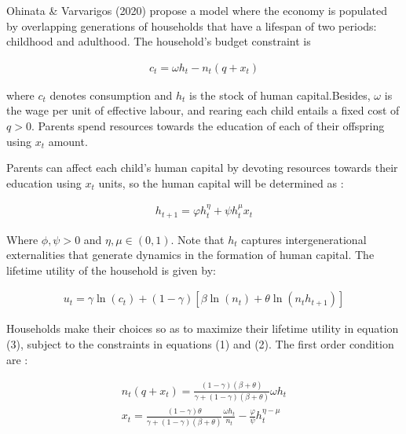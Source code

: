 \begin{enumerate}[label=(\alph*)]

Ohinata \& Varvarigos (2020) propose a model where the economy is populated by overlapping generations of households that have
a lifespan of two periods: childhood and adulthood. The household’s budget constraint is

    \begin{equation}
    \begin{aligned}
    c_{t} = \omega h_{t} - n_{t}(q+x_{t})
    \end{aligned}
    \end{equation}

where $c_{t}$ denotes consumption and $h_{t}$ is the stock of human capital.Besides, $\omega$ is the wage per unit of effective labour, and  rearing each child entails a fixed cost of $q>0$. Parents spend resources towards the education of each of their offspring using $x_t$ amount.  

Parents can affect each child’s human capital by devoting resources towards their education using $x_t$ units, so the human capital will be determined as : 

    \begin{equation}
    \begin{aligned}
    h_{t+1} = \varphi h_{t}^{\eta} + \psi h_{t}^{\mu}x_t 
    \end{aligned}
    \end{equation}

Where $\phi , \psi > 0$ and $\eta , \mu  \in (0, 1)$. Note that $h_t$ captures intergenerational externalities that generate dynamics in the formation of human capital. The lifetime utility of the household is given by:

    \begin{equation}
    \begin{aligned}
    u_{t} = \gamma \ln(c_t) + (1-\gamma)[\beta \ln(n_t) + \theta \ln(n_t h_{t+1})]
    \end{aligned}
    \end{equation}
    
Households make their choices so as to maximize their lifetime utility in
equation (3), subject to the constraints in equations (1) and (2). The first order condition are :

\begin{enumerate}[label=(\roman*)]

    \begin{equation}
    \begin{aligned}
    n_t (q+x_t) = \frac{(1-\gamma)(\beta + \theta)}{\gamma + (1-\gamma)(\beta + \theta)} \omega h_t \\
    x_t = \frac{(1-\gamma)\theta}{\gamma + (1-\gamma)(\beta + \theta)}\frac{\omega h_t}{n_t} - \frac{\varphi}{\psi} h_t^{\eta - \mu}
    

\end{aligned}
\end{equation}
\end{enumerate}
\end{enumerate}
